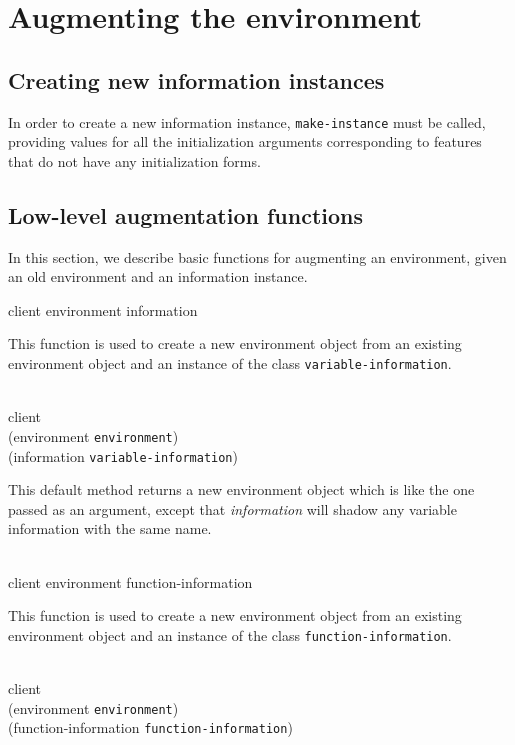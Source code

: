 \chapter{Augmenting the environment}

\section{Creating new information instances}

In order to create a new information instance, \texttt{make-instance}
must be called, providing values for all the initialization arguments
corresponding to features that do not have any initialization forms.

\section{Low-level augmentation functions}

In this section, we describe basic functions for augmenting an
environment, given an old environment and an information instance.

{\footnotesize
{} {client environment information}
}

This function is used to create a new environment object from an
existing environment object and an instance of the class
\texttt{variable-information}.

\\
           {client\\
            (environment {\tt environment})\\
            (information {\tt variable-information})}

This default method returns a new environment object which is like the
one passed as an argument, except that \textit{information}
will shadow any variable information with the same name.

\\
            {client environment function-information}

This function is used to create a new environment object from an
existing environment object and an instance of the class
\texttt{function-information}.

\\
           {client\\
            (environment {\tt environment})\\
            (function-information {\tt function-information})}

